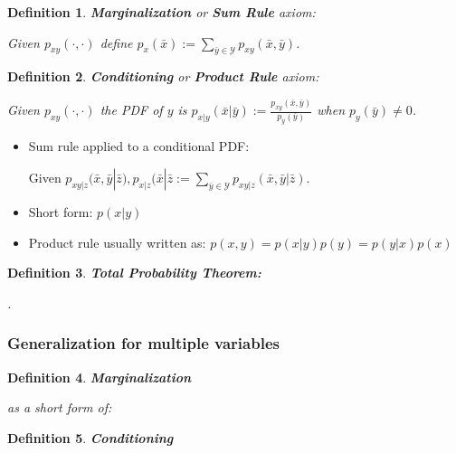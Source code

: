 \documentclass[10pt,a4paper]{scrartcl}
\newtheorem{define}{Definition}
\begin{document}
\begin{multicols*}{2}
\begin{multicols*}{3}
{\begin{define}
\textbf{Marginalization} or \textbf{Sum Rule} axiom:

Given $p_{xy}(\cdot,\cdot)$ define $p_x(\bar{x}):=\sum\limits_{\bar{y}\in\mathcal{Y}}p_{xy}(\bar{x},\bar{y})$.
\end{define}

\begin{define}
\textbf{Conditioning} or \textbf{Product Rule} axiom:

Given $p_{xy}(\cdot,\cdot)$ the PDF of $y$ is $p_{x|y}(\bar{x}|\bar{y}):=\frac{p_{xy}(\bar{x},\bar{y})}{p_y(\bar{y})}$ when $p_y(\bar{y})\neq 0$.
\end{define}

\begin{itemize}
\item Sum rule applied to a conditional PDF:

Given $p_{xy|z}(\bar{x},\bar{y}|\bar{z}),p_{x|z}(\bar{x}|\bar{z}:=\sum\limits_{\bar{y}\in\mathcal{Y}}p_{xy|z}(\bar{x},\bar{y}|\bar{z})$.
\item Short form: $p(x|y)$
\item Product rule usually written as: $p(x,y) = p(x|y)p(y) =p(y|x)p(x)$
\end{itemize}

\begin{define}
\textbf{Total Probability Theorem:}

.
\end{define}

\subsubsection{Generalization for multiple variables}

\begin{define}
\textbf{Marginalization}


as a short form of:

\end{define}

\begin{define}
\textbf{Conditioning}


\end{define}}
\end{multicols*}
\end{multicols*}
\end{document}
